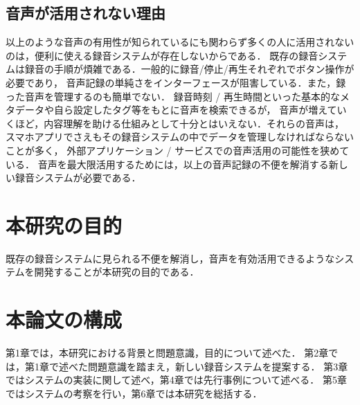 \subsection{音声が活用されない理由}

以上のような音声の有用性が知られているにも関わらず多くの人に活用されないのは，便利に使える録音システムが存在しないからである．
既存の録音システムは録音の手順が煩雑である．一般的に録音/停止/再生それぞれでボタン操作が必要であり，
音声記録の単純さをインターフェースが阻害している．また，録った音声を管理するのも簡単でない．
録音時刻 / 再生時間といった基本的なメタデータや自ら設定したタグ等をもとに音声を検索できるが，
音声が増えていくほど，内容理解を助ける仕組みとして十分とはいえない．それらの音声は，
スマホアプリでさえもその録音システムの中でデータを管理しなければならないことが多く，
外部アプリケーション / サービスでの音声活用の可能性を狭めている．
音声を最大限活用するためには，以上の音声記録の不便を解消する新しい録音システムが必要である．

\section{本研究の目的}

 既存の録音システムに見られる不便を解消し，音声を有効活用できるようなシステムを開発することが本研究の目的である．

\section{本論文の構成}

第1章では，本研究における背景と問題意識，目的について述べた．
第2章では，第1章で述べた問題意識を踏まえ，新しい録音システムを提案する．
第3章ではシステムの実装に関して述べ，第4章では先行事例について述べる．
第5章ではシステムの考察を行い，第6章では本研究を総括する．